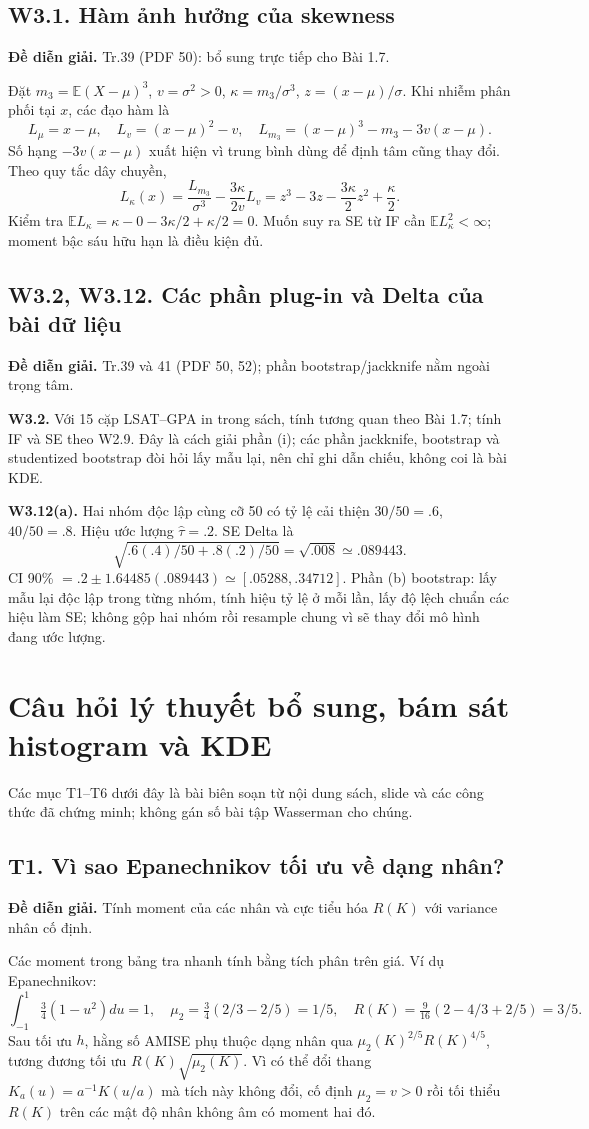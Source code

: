 \documentclass[11pt,a4paper]{article}
\newcommand{\E}{\mathbb E}\newcommand{\Pp}{\mathbb P}
\newcommand{\supp}[3]{\subsection{#1. #2}\label{s:#1}\textbf{Đề diễn giải.} #3\par}
\begin{document}
\supp{W3.1}{Hàm ảnh hưởng của skewness}{Tr.39 (PDF 50): bổ sung trực tiếp cho Bài 1.7.}
Đặt $m_3=\E(X-\mu)^3$, $v=\sigma^2>0$, $\kappa=m_3/\sigma^3$, $z=(x-\mu)/\sigma$.
Khi nhiễm phân phối tại $x$, các đạo hàm là
\[
L_\mu=x-\mu,\quad L_v=(x-\mu)^2-v,\quad
L_{m_3}=(x-\mu)^3-m_3-3v(x-\mu).
\]
Số hạng $-3v(x-\mu)$ xuất hiện vì trung bình dùng để định tâm cũng thay đổi. Theo quy tắc dây chuyền,
\[
L_\kappa(x)=\frac{L_{m_3}}{\sigma^3}-\frac{3\kappa}{2v}L_v
=z^3-3z-\frac{3\kappa}{2}z^2+\frac\kappa2.
\]
Kiểm tra $\E L_\kappa=\kappa-0-3\kappa/2+\kappa/2=0$. Muốn suy ra SE từ IF cần $\E L_\kappa^2<\infty$; moment bậc sáu hữu hạn là điều kiện đủ.

\supp{W3.2, W3.12}{Các phần plug-in và Delta của bài dữ liệu}{Tr.39 và 41 (PDF 50, 52); phần bootstrap/jackknife nằm ngoài trọng tâm.}
\textbf{W3.2.} Với 15 cặp LSAT--GPA in trong sách, tính tương quan theo Bài 1.7; tính IF và SE theo W2.9. Đây là cách giải phần (i); các phần jackknife, bootstrap và studentized bootstrap đòi hỏi lấy mẫu lại, nên chỉ ghi dẫn chiếu, không coi là bài KDE.

\textbf{W3.12(a).} Hai nhóm độc lập cùng cỡ 50 có tỷ lệ cải thiện $30/50=.6$, $40/50=.8$. Hiệu ước lượng $\widehat\tau=.2$. SE Delta là
\[
\sqrt{.6(.4)/50+.8(.2)/50}=\sqrt{.008}\simeq.089443.
\]
CI 90\% $=.2\pm1.64485(.089443)\simeq[.05288,.34712]$.
Phần (b) bootstrap: lấy mẫu lại độc lập trong từng nhóm, tính hiệu tỷ lệ ở mỗi lần, lấy độ lệch chuẩn các hiệu làm SE; không gộp hai nhóm rồi resample chung vì sẽ thay đổi mô hình đang ước lượng.

\section{Câu hỏi lý thuyết bổ sung, bám sát histogram và KDE}
Các mục T1--T6 dưới đây là bài biên soạn từ nội dung sách, slide và các công thức đã chứng minh; không gán số bài tập Wasserman cho chúng.

\supp{T1}{Vì sao Epanechnikov tối ưu về dạng nhân?}{Tính moment của các nhân và cực tiểu hóa $R(K)$ với variance nhân cố định.}
Các moment trong bảng tra nhanh tính bằng tích phân trên giá. Ví dụ Epanechnikov:
\[
\int_{-1}^1\tfrac34(1-u^2)du=1,\quad
\mu_2=\tfrac34(2/3-2/5)=1/5,\quad
R(K)=\tfrac9{16}(2-4/3+2/5)=3/5.
\]
Sau tối ưu $h$, hằng số AMISE phụ thuộc dạng nhân qua $\mu_2(K)^{2/5}R(K)^{4/5}$, tương đương tối ưu $R(K)\sqrt{\mu_2(K)}$. Vì có thể đổi thang $K_a(u)=a^{-1}K(u/a)$ mà tích này không đổi, cố định $\mu_2=v>0$ rồi tối thiểu $R(K)$ trên các mật độ nhân không âm có moment hai đó.
\end{document}
